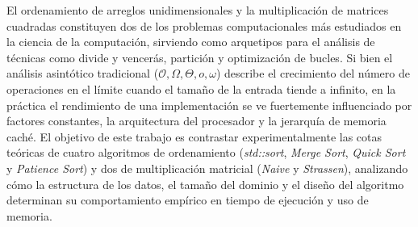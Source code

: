 El ordenamiento de arreglos unidimensionales y la multiplicación de matrices cuadradas constituyen dos de los problemas computacionales más estudiados en la ciencia de la computación, sirviendo como arquetipos para el análisis de técnicas como divide y vencerás, partición y optimización de bucles. Si bien el análisis asintótico tradicional ($\mathcal{O}, \Omega, \Theta, o, \omega$) describe el crecimiento del número de operaciones en el límite cuando el tamaño de la entrada tiende a infinito, en la práctica el rendimiento de una implementación se ve fuertemente influenciado por factores constantes, la arquitectura del procesador y la jerarquía de memoria caché. El objetivo de este trabajo es contrastar experimentalmente las cotas teóricas de cuatro algoritmos de ordenamiento (\textit{std::sort}, \textit{Merge Sort}, \textit{Quick Sort} y \textit{Patience Sort}) y dos de multiplicación matricial (\textit{Naive} y \textit{Strassen}), analizando cómo la estructura de los datos, el tamaño del dominio y el diseño del algoritmo determinan su comportamiento empírico en tiempo de ejecución y uso de memoria.